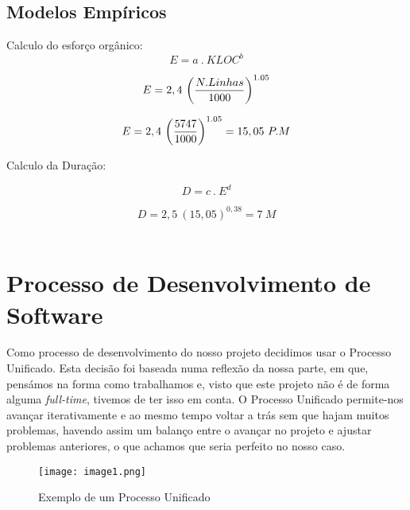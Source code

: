 \documentclass[12pt, a4paper, twoside]{report} %
\begin{document}

\subsection{Modelos Empíricos}

Calculo do esforço orgânico:
\\

\begin{equation}
E = a \ . \ KLOC ^ b
\end{equation}

\begin{equation} E = 2,4 \ \bigg({N.Linhas \over 1000}\bigg)^{1.05}
\end{equation}

\begin{equation}
{E = 2,4 \ \bigg({5747 \over 1000}\bigg) ^ {1.05}}
= 15,05 \ P.M
\end{equation}

Calculo da Duração:

\begin{equation}
D = c \ . \ E^d
\end{equation}

\begin{equation}
D = 2,5 \ (15,05)^{0,38}= 7\ M
\end{equation}
\\

\clearpage
\section{Processo de Desenvolvimento de Software}

Como processo de desenvolvimento do nosso projeto decidimos usar o Processo Unificado.
Esta decisão foi baseada numa reflexão da nossa parte, em que, pensámos na forma como trabalhamos e, visto que este projeto não é de forma alguma \textit{full-time}, tivemos de ter isso em conta. O Processo Unificado permite-nos avançar iterativamente e ao mesmo tempo voltar a trás sem que hajam muitos problemas, havendo assim um balanço entre o avançar no projeto e ajustar problemas anteriores, o que achamos que seria perfeito no nosso caso.
\\

\begin{figure}[h!]
  \centering
    \texttt{[image: image1.png]}
   \caption{Exemplo de um Processo Unificado}
\end{figure}
\end{document}
